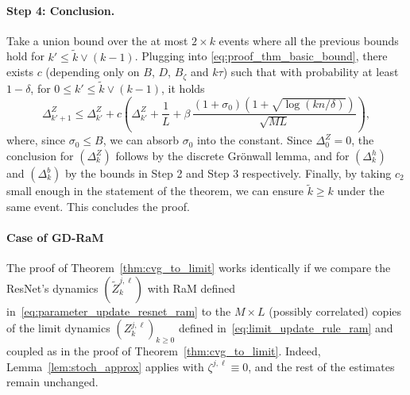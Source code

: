 \documentclass[a4paper,11pt]{article}
\newcommand{\1}{\mathbbm{1}}
\theoremstyle{definition}
\theoremstyle{remark}
\begin{document}
\paragraph{Step 4: Conclusion.} Take a union bound over the at most $2 \times k$ events
where all the previous bounds hold for $k' \leq \tilde{k} \vee (k-1)$. Plugging into
\eqref{eq:proof_thm_basic_bound}, there exists $c$ (depending only on $B$, $D$, ${B_\zeta}$ and $k\tau$) such that with probability at least $1 - \delta$, for
$0 \leq k' \leq \tilde{k} \vee (k-1)$, it holds
\[
  \Delta^Z_{k'+1}
  \leq \Delta^Z_{k'}
  + c \left(
    \Delta^Z_{k'} + \frac{1}{L}
    + {\beta}\,\frac{{(1+\sigma_0)}(1 + \sqrt{\log(kn/\delta)})}{\sqrt{ML}}
  \right),
\]
where, since $\sigma_0 \leq B$, we can absorb $\sigma_0$ into the constant.
Since $\Delta^Z_0 = 0$, the conclusion for $(\Delta^Z_k)$ follows by the discrete Gr\"onwall
lemma, and for $(\Delta^h_k)$ and $(\Delta^b_k)$ by the bounds in Step 2 and Step 3
respectively. Finally, by taking $c_2$ small enough in the statement of the theorem, we
can ensure $\tilde{k} \geq k$ under the same event.
This concludes the proof.

\paragraph{Case of GD-RaM}
{The proof of Theorem~\ref{thm:cvg_to_limit} works identically if we compare the ResNet's dynamics $(\tilde{Z}_k^{j,\ell})$ with RaM defined in~\eqref{eq:parameter_update_resnet_ram} to the $M \times L$ (possibly correlated) copies of the limit dynamics $(Z_k^{j,\ell})_{k \geq 0}$ defined in~\eqref{eq:limit_update_rule_ram}} and coupled as in the proof of Theorem~\ref{thm:cvg_to_limit}. Indeed, Lemma~\ref{lem:stoch_approx} applies with $\zeta^{j,\ell} \equiv 0$, and the rest of the estimates remain unchanged.
\end{document}

